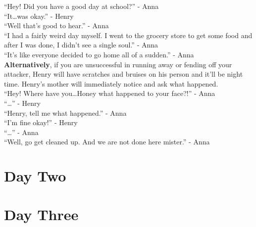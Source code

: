 \documentclass[12pt, a4paper, titlepage]{article}
\begin{document}
            ``Hey! Did you have a good day at school?'' - Anna
            \\

            ``It\dots was okay.'' - Henry
            \\

            ``Well that's good to hear.'' - Anna
            \\

            ``I had a fairly weird day myself. I went to the grocery store to get some food and after I was done, I didn't see a single soul.'' - Anna
            \\

            ``It's like everyone decided to go home all of a sudden.'' - Anna
            \\

            \textbf{Alternatively}, if you are unsuccessful in running away or fending off your attacker, Henry will have 
            scratches and bruises on his person and it'll be night time. Henry's mother will immediately notice and ask what happened.
            \\

            ``Hey! Where have you\ldots Honey what happened to your face?!'' - Anna
            \\

            ``\ldots'' - Henry
            \\

            ``Henry, tell me what happened.'' - Anna
            \\

            ``I'm fine okay!'' - Henry
            \\

            ``\ldots'' - Anna
            \\

            ``Well, go get cleaned up. And we are not done here mister.'' - Anna

            

	\section{Day Two}
	
	\section{Day Three}
\end{document}
